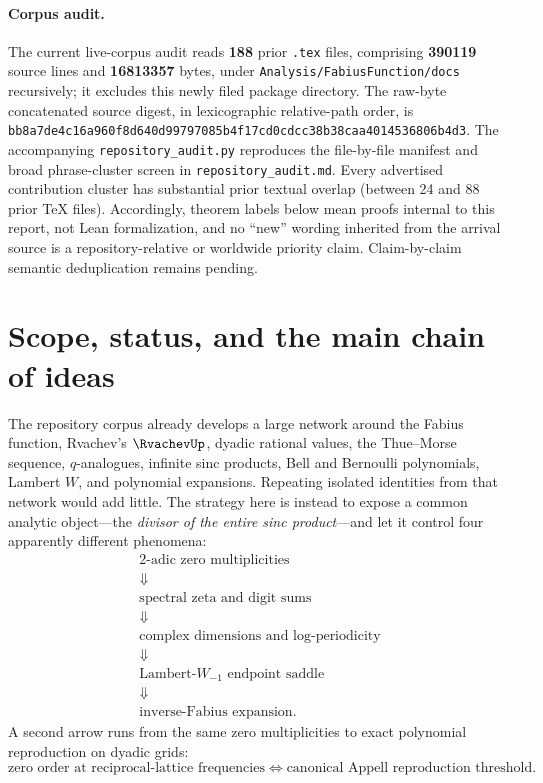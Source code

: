 \documentclass[11pt,oneside]{article}
\theoremstyle{definition}
\theoremstyle{remark}
\begin{document}
\paragraph{Corpus audit.}
The current live-corpus audit reads \textbf{188} prior \texttt{.tex} files,
comprising \textbf{390119} source lines and \textbf{16813357} bytes, under
\texttt{Analysis/FabiusFunction/docs} recursively; it excludes this newly
filed package directory.  The raw-byte concatenated source digest, in
lexicographic relative-path order, is
\texttt{bb8a7de4c16a960f8d640d99797085b4f17cd0cdcc38b38caa4014536806b4d3}.
The accompanying \texttt{repository\_audit.py} reproduces the file-by-file
manifest and broad phrase-cluster screen in
\texttt{repository\_audit.md}.  Every advertised contribution cluster has
substantial prior textual overlap (between 24 and 88 prior TeX files).
Accordingly, theorem labels below mean proofs internal to this report, not
Lean formalization, and no ``new'' wording inherited from the arrival source
is a repository-relative or worldwide priority claim.  Claim-by-claim
semantic deduplication remains pending.

\tableofcontents

\section{Scope, status, and the main chain of ideas}

The repository corpus already develops a large network around the Fabius
function, Rvachev's \(\RvachevUp\), dyadic rational values, the Thue--Morse
sequence, \(q\)-analogues, infinite sinc products, Bell and Bernoulli
polynomials, Lambert \(W\), and polynomial expansions.  Repeating isolated
identities from that network would add little.  The strategy here is instead
to expose a common analytic object---the \emph{divisor of the entire sinc
product}---and let it control four apparently different phenomena:
\[
\boxed{
\begin{array}{c}
\text{\(2\)-adic zero multiplicities}\\
\Downarrow\\
\text{spectral zeta and digit sums}\\
\Downarrow\\
\text{complex dimensions and log-periodicity}\\
\Downarrow\\
\text{Lambert-\(W_{-1}\) endpoint saddle}\\
\Downarrow\\
\text{inverse-Fabius expansion}.
\end{array}}
\]
A second arrow runs from the same zero multiplicities to exact polynomial
reproduction on dyadic grids:
\[
 \text{zero order at reciprocal-lattice frequencies}
 \Longleftrightarrow
 \text{canonical Appell reproduction threshold}.
\]
\end{document}
